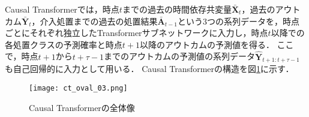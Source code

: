 \documentclass[dvipdfmx]{jreport}
\begin{document}
Causal Transformerでは，時点$t$までの過去の時間依存共変量$\bar{\mathbf{X}}_t$，過去のアウトカム$\bar{\mathbf{Y}}_t$，介入処置までの過去の処置結果$\bar{\mathbf{A}}_{t-1}$という3つの系列データを，時点ごとにそれぞれ独立したTransformerサブネットワークに入力し，時点$t$以降での各処置クラスの予測確率と時点$t+1$以降のアウトカムの予測値を得る．
ここで，時点$t+1$から$t+\tau-1$までのアウトカムの予測値の系列データ$\hat{\mathbf{Y}}_{t+1:t+\tau-1}$も自己回帰的に入力として用いる．
Causal Transformerの構造を図\ref{fig:ct_oval}に示す．

\begin{figure}[h]
    \begin{center}
        \texttt{[image: ct\_oval\_03.png]} 
        \caption{Causal Transformerの全体像} \label{fig:ct_oval}
    \end{center}
\end{figure}
\end{document}
